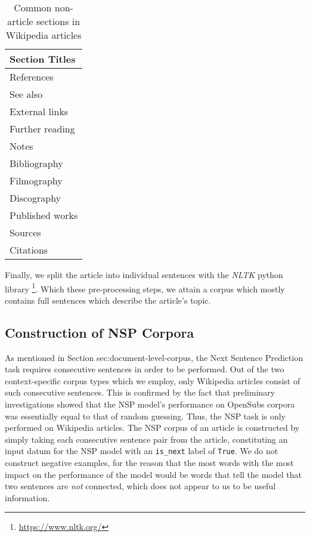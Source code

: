 \begin{table}[H]
	\centering
	\begin{tabular}{|l|}
		\hline
		\textbf{Section Titles} \\
		\hline
		References              \\
		See also                \\
		External links          \\
		Further reading         \\
		Notes                   \\
		Bibliography            \\
		Filmography             \\
		Discography             \\
		Published works         \\
		Sources                 \\
		Citations               \\
		\hline
	\end{tabular}
	\caption{Common non-article sections in Wikipedia articles}
	\label{tbl:wikipedia-ignored-headings}
\end{table}

Finally, we split the article into individual sentences with the \textit{NLTK} python library \footnote{\url{https://www.nltk.org/}}.
Which these pre-processing steps, we attain a corpus which mostly contains full	sentences which describe the article's topic.


\subsection{Construction of NSP Corpora}
As mentioned in Section {sec:document-level-corpus}, the Next Sentence Prediction task requires consecutive sentences in order to be performed.
Out of the two context-specific corpus types which we employ, only Wikipedia articles consist of such consecutive sentences.
This is confirmed by the fact that preliminary investigations showed that the NSP model's performance on OpenSubs corpora was essentially equal to that of random guessing.
Thus, the NSP task is only performed on Wikipedia articles.
The NSP corpus of an article is constructed by simply taking each consecutive sentence pair from the article, constituting an input datum for the NSP model with an \texttt{is\_next} label of \texttt{True}.
We do not construct negative examples, for the reason that the most words with the most impact on the performance of the model would be words that tell the model that two sentences are \textit{not} connected, which does not appear to us to be useful information.

